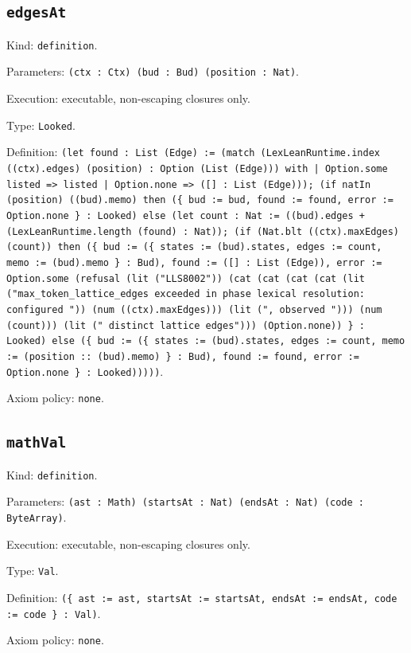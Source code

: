 \documentclass[11pt]{article}
\begin{document}
\subsection*{\texttt{edgesAt}}
\noindent Kind: \texttt{definition}.\par
\noindent Parameters: \texttt{(ctx : Ctx) (bud : Bud) (position : Nat)}.\par
\noindent Execution: executable, non-escaping closures only.\par
\noindent Type: \texttt{Looked}.\par
\noindent Definition: \texttt{(let found : List (Edge) := (match (LexLeanRuntime.index ((ctx).edges) (position) : Option (List (Edge))) with | Option.some listed => listed | Option.none => ([] : List (Edge))); (if natIn (position) ((bud).memo) then (\{ bud := bud, found := found, error := Option.none \} : Looked) else (let count : Nat := ((bud).edges + (LexLeanRuntime.length (found) : Nat)); (if (Nat.blt ((ctx).maxEdges) (count)) then (\{ bud := (\{ states := (bud).states, edges := count, memo := (bud).memo \} : Bud), found := ([] : List (Edge)), error := Option.some (refusal (lit ("LLS8002")) (cat (cat (cat (cat (lit ("max\_token\_lattice\_edges exceeded in phase lexical resolution: configured ")) (num ((ctx).maxEdges))) (lit (", observed "))) (num (count))) (lit (" distinct lattice edges"))) (Option.none)) \} : Looked) else (\{ bud := (\{ states := (bud).states, edges := count, memo := (position :: (bud).memo) \} : Bud), found := found, error := Option.none \} : Looked)))))}.\par
\noindent Axiom policy: \texttt{none}.\par
\subsection*{\texttt{mathVal}}
\noindent Kind: \texttt{definition}.\par
\noindent Parameters: \texttt{(ast : Math) (startsAt : Nat) (endsAt : Nat) (code : ByteArray)}.\par
\noindent Execution: executable, non-escaping closures only.\par
\noindent Type: \texttt{Val}.\par
\noindent Definition: \texttt{(\{ ast := ast, startsAt := startsAt, endsAt := endsAt, code := code \} : Val)}.\par
\noindent Axiom policy: \texttt{none}.\par
\end{document}
